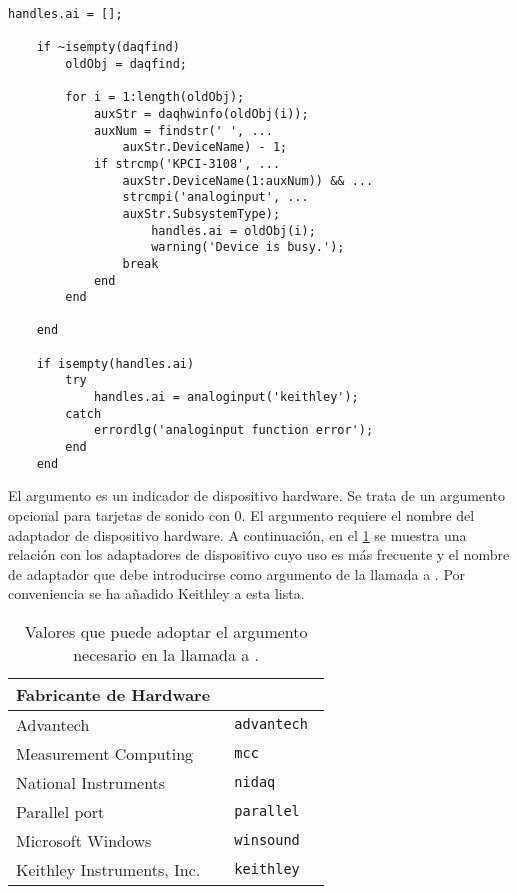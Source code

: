\begin{lstlisting}[style=displayed, caption={[Método a seguir para crear un
	objeto dispositivo] {Método que evalúa la existencia de un objeto
	dispositivo previo a la llamada de la aplicación, en caso positivo
	lo hereda para su uso posterior, de lo contrario crea uno
	nuevo.}}, label={cod:constructor}]
	handles.ai = [];

	if ~isempty(daqfind)
		oldObj = daqfind;

		for i = 1:length(oldObj);
			auxStr = daqhwinfo(oldObj(i));
			auxNum = findstr(' ', ...
				auxStr.DeviceName) - 1;
			if strcmp('KPCI-3108', ...
				auxStr.DeviceName(1:auxNum)) && ...
				strcmpi('analoginput', ...
				auxStr.SubsystemType);
					handles.ai = oldObj(i);
					warning('Device is busy.');
				break
			end
		end

	end

	if isempty(handles.ai)
		try
			handles.ai = analoginput('keithley');
		catch
			errordlg('analoginput function error');
		end
	end
\end{lstlisting}

El argumento  es un indicador de dispositivo hardware. Se trata de
un argumento opcional para tarjetas de sonido con  0. El argumento
 requiere el nombre del adaptador de dispositivo hardware.
A continuación, en el \cref{tab:adaptors} se muestra una relación con los
adaptadores de dispositivo cuyo uso es más frecuente y el nombre de
adaptador que debe introducirse como argumento de la llamada a
. Por conveniencia se ha añadido Keithley a esta lista.

\begin{table}
	\centering
	\begin{tabular}{l >{\tt\qquad}l}
		\toprule
		\multicolumn{1}{c}{Fabricante de Hardware} %
		& \multicolumn{1}{c}{\rm Nombre de adaptador} \\
		\midrule
		Advantech & advantech \\
		\midrule
		Measurement Computing & mcc \\
		\midrule
		National Instruments & nidaq \\
		\midrule
		Parallel port & parallel \\
		\midrule
		Microsoft Windows & winsound \\
		\midrule
		Keithley Instruments, Inc. & keithley \\
		\bottomrule
	\end{tabular}
	\caption[Valores que puede adoptar el argumento
	.]{Valores que puede adoptar el argumento
	 necesario en la llamada a .}
	\label{tab:adaptors}
\end{table}


